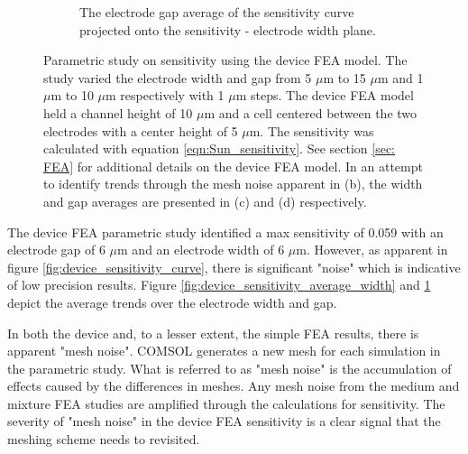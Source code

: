 \begin{figure}[h]
\begin{subfigure}[b]{0.49\textwidth}
        \caption{The electrode gap average of the sensitivity curve projected onto the sensitivity - electrode width plane.}
        \label{fig:device_sensitivity_average_gap}
    \end{subfigure}
    \caption[Device sensitivity]{Parametric study on sensitivity using the device FEA model. The study varied the electrode width and gap from 5 $\mu$m to 15 $\mu$m and 1 $\mu$m to 10 $\mu$m respectively with 1 $\mu$m steps. The device FEA model held a channel height of 10 $\mu$m and a cell centered between the two electrodes with a center height of 5 $\mu$m. The sensitivity was calculated with equation \ref{eqn:Sun_sensitivity}. See section \ref{sec: FEA} for additional details on the device FEA model. In an attempt to identify trends through the mesh noise apparent in (b), the width and gap averages are presented in (c) and (d) respectively.}
    \label{fig:device_sensitivity}
\end{figure}

\par The device FEA parametric study identified a max sensitivity of 0.059 with an electrode gap of 6 $\mu$m and an electrode width of 6 $\mu$m. However, as apparent in figure \ref{fig:device_sensitivity_curve}, there is significant "noise" which is indicative of low precision results. Figure \ref{fig:device_sensitivity_average_width} and \ref{fig:device_sensitivity_average_gap} depict the average trends over the electrode width and gap.



\par In both the device and, to a lesser extent, the simple FEA results, there is apparent "mesh noise". COMSOL generates a new mesh for each simulation in the parametric study. What is referred to as "mesh noise" is the accumulation of effects caused by the differences in meshes. Any mesh noise from the medium and mixture FEA studies are amplified through the calculations for sensitivity. The severity of "mesh noise" in the device FEA sensitivity is a clear signal that the meshing scheme needs to revisited.

